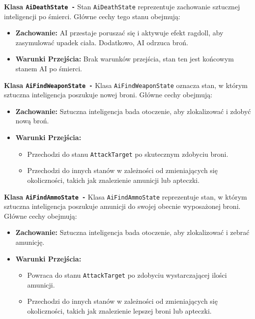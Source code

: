 \textbf{Klasa \texttt{AiDeathState -}}
Stan \texttt{AiDeathState} reprezentuje zachowanie sztucznej inteligencji po śmierci. Główne cechy tego stanu obejmują:
\begin{itemize}
  \item \textbf{Zachowanie:} AI przestaje poruszać się i aktywuje efekt ragdoll, aby zasymulować upadek ciała. Dodatkowo, AI odrzuca broń.
  \item \textbf{Warunki Przejścia:} Brak warunków przejścia, stan ten jest końcowym stanem AI po śmierci.
\end{itemize}

\textbf{Klasa \texttt{AiFindWeaponState -}}
Klasa \texttt{AiFindWeaponState} oznacza stan, w którym sztuczna inteligencja poszukuje nowej broni. Główne cechy obejmują:
\begin{itemize}
  \item \textbf{Zachowanie:} Sztuczna inteligencja bada otoczenie, aby zlokalizować i zdobyć nową broń.
  \item \textbf{Warunki Przejścia:}
    \begin{itemize}
      \item Przechodzi do stanu \texttt{AttackTarget} po skutecznym zdobyciu broni.
      \item Przechodzi do innych stanów w zależności od zmieniających się okoliczności, takich jak znalezienie amunicji lub apteczki.
    \end{itemize}
\end{itemize}

\textbf{Klasa \texttt{AiFindAmmoState -}}
Klasa \texttt{AiFindAmmoState} reprezentuje stan, w którym sztuczna inteligencja poszukuje amunicji do swojej obecnie wyposażonej broni. Główne cechy obejmują:
\begin{itemize}
  \item \textbf{Zachowanie:} Sztuczna inteligencja bada otoczenie, aby zlokalizować i zebrać amunicję.
  \item \textbf{Warunki Przejścia:}
    \begin{itemize}
      \item Powraca do stanu \texttt{AttackTarget} po zdobyciu wystarczającej ilości amunicji.
      \item Przechodzi do innych stanów w zależności od zmieniających się okoliczności, takich jak znalezienie lepszej broni lub apteczki.
    \end{itemize}
\end{itemize}

